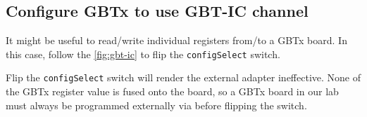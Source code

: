 \subsection{Configure GBTx to use GBT-IC channel}
It might be useful to read/write individual registers from/to a GBTx board. In
this case, follow the \autoref{fig:gbt-ic} to flip the \texttt{configSelect}
switch.

\begin{leftbar}
    Flip the \texttt{configSelect} switch will render the external \itwoc
    adapter ineffective.
    None of the GBTx register value is fused onto the board, so a GBTx board in
    our lab must always be programmed externally via \itwoc before flipping the
    switch.
\end{leftbar}
